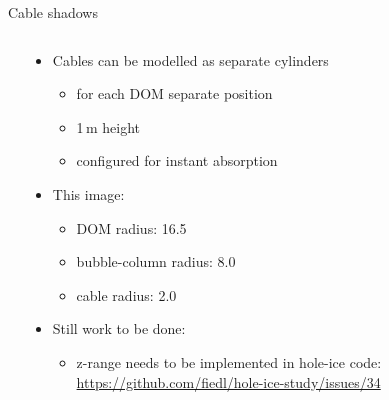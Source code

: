 
\begin{frame}[fragile]{Cable shadows}

  \begin{columns}
    \begin{column}{0.5\textwidth}


    \end{column}
    \begin{column}{0.5\textwidth}

      \begin{itemize}
        \item Cables can be modelled as separate cylinders
          \begin{itemize}
            \item for each DOM separate position
            \item 1\,m height
            \item configured for instant absorption
          \end{itemize}
        \item This image:
          \begin{itemize}
            \item DOM radius: 16.5\cm
            \item bubble-column radius: 8.0\cm
            \item cable radius: 2.0\cm
          \end{itemize}
        \item Still work to be done:
          \begin{itemize}
            \item z-range needs to be implemented in hole-ice code:
                \tiny \url{https://github.com/fiedl/hole-ice-study/issues/34} \small
          \end{itemize}
      \end{itemize}


    \end{column}
  \end{columns}

\end{frame}